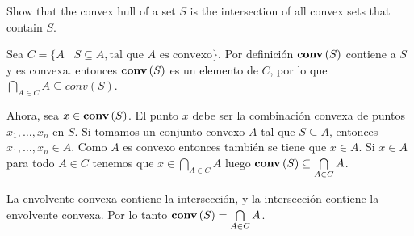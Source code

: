 
\begin{enunciado}{2.4}
Show that the convex hull of a set $S$ is the intersection of all convex sets that contain $S$.
\end{enunciado}

Sea $C = \{ A \mid S \subseteq A, \text{tal que $A$ es convexo} \}$.
Por definición $\mathbf{conv}\,(S)$ contiene a $S$ y es convexa.
entonces $\mathbf{conv}\,(S)$ es un elemento de $C$,
por lo que $\bigcap\limits_{A\in C} A \subseteq conv(S)$.

Ahora, sea $x \in \mathbf{conv}\,(S)$.
El punto $x$ debe ser la combinación convexa de puntos $x_1, \dots, x_n$ en $S$.
Si tomamos un conjunto convexo $A$ tal que $S \subseteq A$,
entonces $x_1, \dots, x_n \in A$.
Como $A$ es convexo entonces también se tiene que $x \in A$.
Si $x\in A$ para todo $A \in C$ tenemos que $x\in \bigcap\limits_{A\in C} A$
luego $\mathbf{conv}\,(S) \subseteq \bigcap\limits_{A\in C} A$.

La envolvente convexa contiene la intersección, y la intersección contiene la envolvente convexa.
Por lo tanto $\mathbf{conv}\,(S) = \bigcap\limits_{A\in C} A$.

